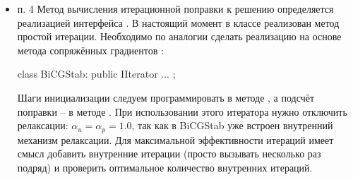 \begin{itemize}
Сначала матрица левой части собирается в глобальную,
потом вызывается решатель, для нахождения неизвестного вектора $x$ в левой части.
Полученная матрица имеет проблему седловой точки (нули на диагоналях),
поэтому её нельзя решить общими итерационными методами.
Для её решения исплользуется точный решатель .
Предлагается решать эту систему с следующем порядке
\begin{equation*}
\left(
\begin{matrix}
A & 0 \\
B & -S
\end{matrix}
\right)
\left(
\begin{matrix}
y_u\\
y_p
\end{matrix}
\right) = 
\left(
\begin{matrix}
r_u\\
r_p
\end{matrix}
\right)
\end{equation*}
откуда
\begin{align*}
&y_u = A^{-1} r_u,\\
&y_p = S^{-1} (B y_u - r_p).
\end{align*}
Далее
\begin{equation*}
\left(
\begin{matrix}
I & HB^T \\
0 & I
\end{matrix}
\right)
\left(
\begin{matrix}
x_u\\
x_p
\end{matrix}
\right) = 
\left(
\begin{matrix}
y_u\\
y_p
\end{matrix}
\right)
\end{equation*}
откуда
\begin{align*}
&x_p = y_p, \\
&x_u = y_u - H B^T x_p
\end{align*}
Для вычисления $y$ воспользоваться матричным решателем.
Сначала точным (),
потом, если всё работает, можно перейти на итерационный
() и сравнить время работы.

\item п. 4
Метод вычисления итерационной поправки к решению определяется реализацией
интерфейса .
В настоящий момент в классе  реализован метод простой итерации.
Необходимо по аналогии сделать реализацию на основе метода сопряжённых градиентов :
\begin{cppcode}
class BiCGStab: public IIterator { ... };
\end{cppcode}
Шаги инициализации следуем программировать в методе , а подсчёт
поправки -- в методе .
При использовании этого итератора нужно
отключить релаксации: $\alpha_u = \alpha_p = 1.0$,
так как в BiCGStab уже встроен внутренний механизм релаксации.
Для максимальной эффективности итераций имеет смысл добавить внутренние
итерации (просто вызывать  несколько раз подряд) и проверить оптимальное количество внутренних итераций.


\end{itemize}
